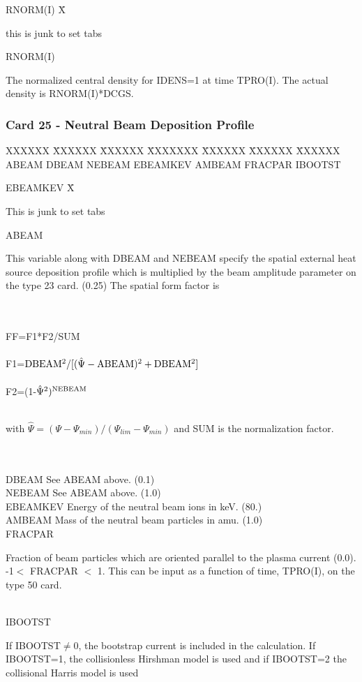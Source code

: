 \begin{tabbing}
RNORM(I) X\= \parbox[t]{\width}{this is junk to set tabs} \kill
RNORM(I) \> \parbox[t]{\width}{The normalized central density for IDENS=1 at time TPRO(I).
The actual density is RNORM(I)*DCGS.}
\end{tabbing}
\newpage \subsubsection{Card 25 - Neutral Beam Deposition Profile}
\begin{tabbing}
XXXXXX \= XXXXXX \= XXXXXX \= XXXXXXX \= XXXXXX \= XXXXXX \=
XXXXXX       \\
\footnotesize  ABEAM  \>\footnotesize DBEAM  \>\footnotesize NEBEAM \>\footnotesize
EBEAMKEV \>\footnotesize AMBEAM  \>\footnotesize FRACPAR \>\footnotesize IBOOTST
\end{tabbing}
\begin{tabbing}
EBEAMKEV X\= \parbox[t]{\width}{This is junk to set tabs} \kill
ABEAM \>\parbox[t]{\width}{This variable along with DBEAM and NEBEAM specify the
spatial
external heat source deposition profile which is multiplied by the beam amplitude parameter on
the type 23 card. (0.25)  The spatial form factor is}\\
 \\
\> FF=F1*F2/SUM\\
 \\
\> F1=$\rm DBEAM ^2/[(\hat{\Psi}-ABEAM)^2+DBEAM^2]$\\
 \\
\> F2=(1-$\rm \hat{\Psi}^2)^{NEBEAM}$\\
 \\
\>\parbox[t]{\width}{with $\hat{\Psi}=(\Psi-\Psi_{min})/(\Psi_{lim}-\Psi_{min})$ and SUM is
the normalization factor.}\\
\\
DBEAM \> See ABEAM above. (0.1)\\
NEBEAM \> See ABEAM above. (1.0)\\
EBEAMKEV \> Energy of the neutral beam ions in keV. (80.)\\
AMBEAM \> Mass of the neutral beam particles in amu. (1.0)\\
FRACPAR \> \parbox[t]{\width}{Fraction of beam particles which are oriented parallel to the
plasma current (0.0). -1$<$ FRACPAR $<$ 1. This can be input as a
function of time, TPRO(I), on the type 50 card.}\\
IBOOTST \>\parbox[t]{\width}{If IBOOTST$\ne$0, the bootstrap current is included in the
calculation.  If IBOOTST=1, the collisionless Hirshman model is used and if IBOOTST=2 the
collisional Harris model is used}       
\end{tabbing}
\pagebreak
